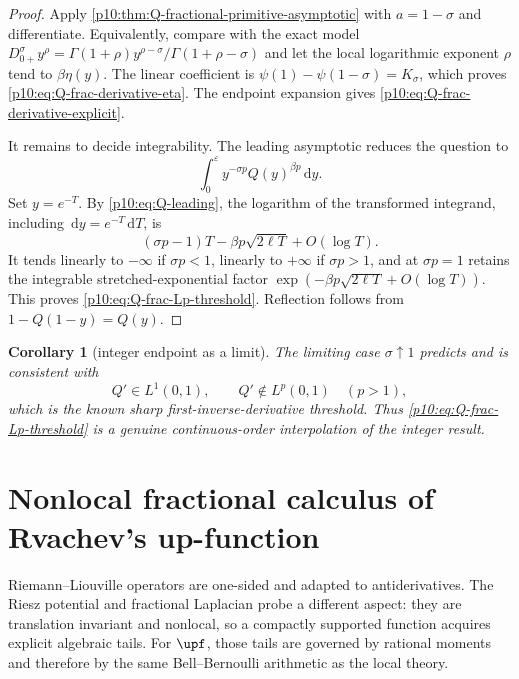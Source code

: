 \documentclass[11pt,oneside]{article}
\newtheorem{corollary}[theorem]{Corollary}
\theoremstyle{definition}
\theoremstyle{remark}
\newcommand{\Q}{Q}
\newcommand{\dd}{\,\mathrm d}
\newcommand{\1}{\mathbf 1}
\begin{document}
\begin{proof}
Apply \cref{p10:thm:Q-fractional-primitive-asymptotic} with \(a=1-\sigma\) and
differentiate.  Equivalently, compare with the exact model
\(
 D_{0+}^{\sigma}y^\rho
 =\Gamma(1+\rho)y^{\rho-\sigma}/\Gamma(1+\rho-\sigma)
\)
and let the local logarithmic exponent \(\rho\) tend to \(\beta\eta(y)\).  The
linear coefficient is
\(
 \psi(1)-\psi(1-\sigma)=K_\sigma
\), which proves \eqref{p10:eq:Q-frac-derivative-eta}.  The endpoint expansion gives
\eqref{p10:eq:Q-frac-derivative-explicit}.

It remains to decide integrability.  The leading asymptotic reduces the question to
\begin{equation}\label{p10:eq:critical-integral}
 \int_0^\varepsilon y^{-\sigma p}\Q(y)^{\beta p}\dd y.
\end{equation}
Set \(y=e^{-T}\).  By \eqref{p10:eq:Q-leading}, the logarithm of the transformed
integrand, including \(\dd y=e^{-T}\dd T\), is
\begin{equation}\label{p10:eq:critical-exponent}
 (\sigma p-1)T-\beta p\sqrt{2\ell T}+O(\log T).
\end{equation}
It tends linearly to \(-\infty\) if \(\sigma p<1\), linearly to \(+\infty\) if
\(\sigma p>1\), and at \(\sigma p=1\) retains the integrable stretched-exponential
factor \(\exp(-\beta p\sqrt{2\ell T}+O(\log T))\).  This proves
\eqref{p10:eq:Q-frac-Lp-threshold}.  Reflection follows from
\(1-\Q(1-y)=\Q(y)\).
\end{proof}

\begin{corollary}[integer endpoint as a limit]\label{p10:cor:Qprime-critical}
The limiting case \(\sigma\uparrow1\) predicts and is consistent with
\begin{equation}\label{p10:eq:Qprime-Lp}
 \Q'\in L^1(0,1),
 \qquad
 \Q'\notin L^p(0,1)\quad(p>1),
\end{equation}
which is the known sharp first-inverse-derivative threshold.  Thus
\eqref{p10:eq:Q-frac-Lp-threshold} is a genuine continuous-order interpolation of the
integer result.
\end{corollary}

\section{Nonlocal fractional calculus of Rvachev's up-function}
\label{p10:sec:up-nonlocal-fractional}

Riemann--Liouville operators are one-sided and adapted to antiderivatives.  The Riesz
potential and fractional Laplacian probe a different aspect: they are translation
invariant and nonlocal, so a compactly supported function acquires explicit algebraic
tails.  For \(\upf\), those tails are governed by rational moments and therefore by the
same Bell--Bernoulli arithmetic as the local theory.
\end{document}
